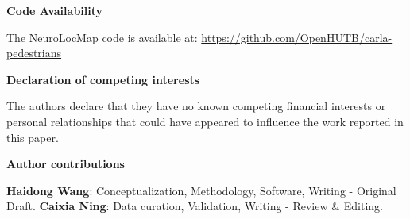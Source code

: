 \documentclass[preprint,12pt]{elsarticle}
\begin{document}
\vspace{1em}
\noindent \textbf{Code Availability}
\vspace{0.5em}

The NeuroLocMap code is available at: \url{https://github.com/OpenHUTB/carla-pedestrians}

\vspace{1em}
\noindent \textbf{Declaration of competing interests}
\vspace{0.5em}

The authors declare that they have no known competing financial interests or personal relationships that could have appeared to influence the work reported in this paper.

\vspace{1em}
\noindent \textbf{Author contributions}
\vspace{0.5em}

\textbf{Haidong Wang}: Conceptualization, Methodology, Software, Writing - Original Draft. \textbf{Caixia Ning}: Data curation, Validation, Writing - Review \& Editing.

 

\end{document}
